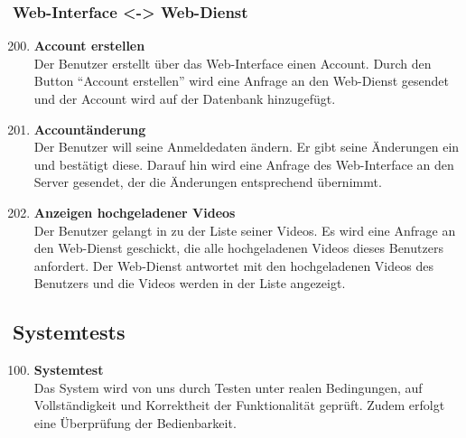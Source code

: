 \subsubsection{\gls{Web-Interface} <-> \gls{Web-Dienst}}
\begin{enumerate}[\bfseries{TI}10]  
\setcounter{enumi}{199}{}

\item \textbf{Account erstellen} \hfill\\
Der Benutzer erstellt \"uber das \gls{Web-Interface} einen Account. Durch den Button ``Account erstellen'' wird eine Anfrage an den \gls{Web-Dienst} gesendet und der Account wird auf der Datenbank hinzugef\"ugt.

\item \textbf{Account\"anderung} \hfill\\
Der Benutzer will seine Anmeldedaten \"andern. Er gibt seine Änderungen ein und best\"atigt diese. Darauf hin wird eine Anfrage des \gls{Web-Interface} an den Server gesendet, der die Änderungen entsprechend übernimmt.

\item \textbf{Anzeigen hochgeladener Videos} \hfill\\
Der Benutzer gelangt in zu der Liste seiner Videos. Es wird  eine Anfrage an den \gls{Web-Dienst} geschickt, die alle hochgeladenen Videos dieses Benutzers anfordert. Der Web-Dienst antwortet mit den hochgeladenen Videos des Benutzers und die Videos werden in der Liste angezeigt. 

\end{enumerate}

\subsection{Systemtests}
\begin{enumerate}[\bfseries{TS}10]  
\setcounter{enumi}{99}{}

\item \textbf{Systemtest} \hfill\\  
Das System wird von uns durch Testen unter realen Bedingungen, auf Vollständigkeit und Korrektheit der Funktionalität geprüft. Zudem erfolgt eine Überprüfung der Bedienbarkeit. 
\end{enumerate}
